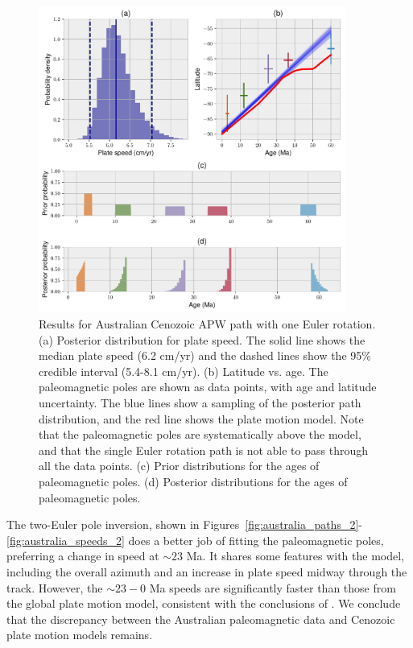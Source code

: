 \documentclass[preprint,12pt,authoryear]{elsarticle}
\begin{document}
\begin{figure}
\includegraphics[width=0.9\textwidth]{figures/australia/australia_speeds_1.pdf}
\caption[Results for Australian Cenozoic APW path with one Euler rotation.]{Results for Australian Cenozoic APW path with one Euler rotation. 
(a) Posterior distribution for plate speed. The solid line shows the median plate speed (6.2 cm/yr) and the dashed lines show the 95\% credible interval (5.4-8.1 cm/yr).
(b) Latitude vs. age. The paleomagnetic poles are shown as data points, with age and latitude uncertainty. The blue lines show a sampling of the posterior path distribution, and the red line shows the \citet{seton2012global} plate motion model. Note that the paleomagnetic poles are systematically above the \citet{seton2012global} model, and that the single Euler rotation path is not able to pass through all the data points.
(c) Prior distributions for the ages of paleomagnetic poles.
(d) Posterior distributions for the ages of paleomagnetic poles.}
\label{fig:australia_speeds_1}
\end{figure}

The two-Euler pole inversion, shown in Figures~\ref{fig:australia_paths_2}-\ref{fig:australia_speeds_2} does a better job of
fitting the paleomagnetic poles, preferring a change in speed at $\sim 23$ Ma.
It shares some features with the \citet{seton2012global} model, including the overall azimuth and an
increase in plate speed midway through the track.
However, the $\sim23-0$ Ma speeds are significantly faster than those from the global plate motion model,
consistent with the conclusions of \citet{idnurm1985lateII}.
We conclude that the discrepancy between the Australian paleomagnetic data and
Cenozoic plate motion models remains.
\end{document}
